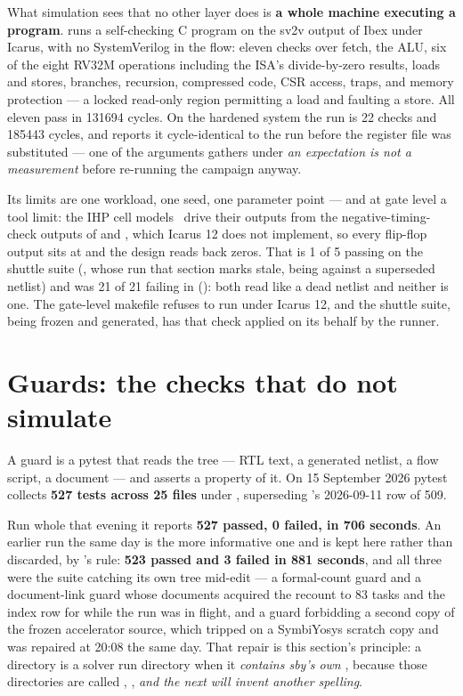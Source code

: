 What simulation sees that no other layer does is \textbf{a whole machine
executing a program}.  runs a self-checking C
program on the sv2v output of Ibex under Icarus, with no SystemVerilog
in the flow: eleven checks over fetch, the ALU, six of the eight RV32M
operations including the ISA's divide-by-zero results, loads and stores, branches,
recursion, compressed code, CSR access, traps, and memory protection --- a locked read-only region permitting a load and faulting a store. All eleven pass in \num{131694} cycles. On
the hardened system the run is 22 checks and \num{185443} cycles, and
 reports it cycle-identical to the run before the
register file was substituted --- one of the arguments  gathers under \emph{an expectation is not a measurement} before re-running the campaign anyway.

Its limits are one workload, one seed, one parameter point --- and at
gate level a tool limit: the IHP cell models~\cite{ihppdk} drive their outputs from
the negative-timing-check outputs of  and
, which Icarus 12 does not implement, so every flip-flop
output sits at  and the design reads back zeros. That is 1 of 5
passing on the shuttle suite (, whose run that
section marks stale, being against a superseded netlist) and was 21 of 21
failing in  (): both read like a dead
netlist and neither is one. The gate-level makefile refuses to run under
Icarus 12, and the shuttle suite, being frozen and generated, has that
check applied on its behalf by the runner.

\section{Guards: the checks that do not simulate}
\label{sec:verif-guards}

A guard is a pytest that reads the tree --- RTL text, a generated netlist, a flow script, a document --- and asserts a property of it. On 15 September 2026 pytest collects \textbf{527 tests across 25 files} under , superseding 's 2026-09-11 row of 509.

Run whole that evening it reports \textbf{527 passed, 0 failed, in 706 seconds}. An earlier run the same day is the more informative one and is kept here rather than discarded, by 's rule: \textbf{523 passed and 3 failed in 881 seconds}, and all three were the suite catching its own tree mid-edit --- a formal-count guard and a document-link guard whose documents acquired the recount to 83 tasks and the index row for  while the run was in flight, and a guard forbidding a second copy of the frozen accelerator source, which tripped on a SymbiYosys scratch copy and was repaired at 20:08 the same day. That repair is this section's principle: a directory is a solver run directory when it \emph{contains sby's own} , because those directories are called , ,  \emph{and the next will invent another spelling}.

